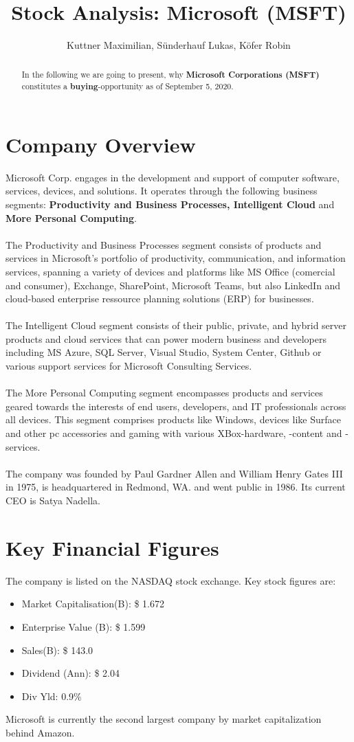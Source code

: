 \documentclass[]{article}
\title{Stock Analysis: Microsoft (MSFT)}
\author{Kuttner Maximilian, Sünderhauf Lukas, Köfer Robin}
\begin{document}
\maketitle



\begin{abstract}
\noindent In the following we are going to present, why \textbf{Microsoft Corporations (MSFT)} constitutes a \textbf{buying}-opportunity as of September 5, 2020.
\end{abstract}

\section{Company Overview}
Microsoft Corp. engages in the development and support of computer software, services, devices, and solutions. It operates through the following business segments: \textbf{Productivity and Business Processes, Intelligent Cloud} and \textbf{More Personal Computing}.\\\\
The Productivity and Business Processes segment consists of products and services in Microsoft's portfolio of productivity, communication, and information services, spanning a variety of devices and platforms like MS Office (comercial and consumer), Exchange, SharePoint, Microsoft Teams, but also LinkedIn and cloud-based enterprise ressource planning solutions (ERP) for businesses.\\\\
The Intelligent Cloud segment consists of their public, private, and hybrid server products and cloud services that can power modern business and developers including MS Azure, SQL Server, Visual Studio, System Center, Github or various support services for Microsoft Consulting Services.\\\\
The More Personal Computing segment encompasses products and services geared towards the interests of end users, developers, and IT professionals across all devices. This segment comprises products like Windows, devices like Surface and other pc accessories and gaming with various XBox-hardware, -content and -services.\\\\
The company was founded by Paul Gardner Allen and William Henry Gates III in 1975, is headquartered in Redmond, WA. and went public in 1986. Its current CEO is Satya Nadella.\cite{wiki:xxx}
\clearpage
\section{Key Financial Figures}
The company is listed on the NASDAQ stock exchange. Key stock figures are:
\begin{itemize}
	\item Market Capitalisation(B): \$ 1.672
	\item Enterprise Value (B): \$ 1.599
	\item Sales(B): \$ 143.0
	\item Dividend (Ann): \$ 2.04
	\item Div Yld: 0.9\%
\end{itemize}
Microsoft is currently the second largest company by market capitalization behind Amazon.
\end{document}
